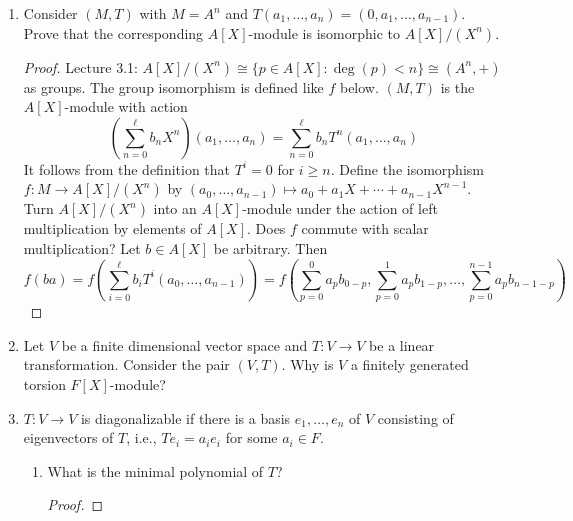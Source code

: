 \documentclass[../psets.tex]{subfiles}
\begin{document}
\begin{enumerate}
\begin{enumerate}
\begin{proof}
\begin{equation*}
                = S(S^{-1}(Xm))
                = Xm
                = T_2m
            \end{equation*}
            Now suppose that conditions (a)-(b) hold. To prove that $S$ is an $A[X]$-module isomorphism, it will suffice to show that $S$ is a group homomorphism and commutes with scalar multiplication. Just check axioms??
        \end{proof}
    \end{enumerate}
    \item Consider $(M,T)$ with $M=A^n$ and $T(a_1,\dots,a_n)=(0,a_1,\dots,a_{n-1})$. Prove that the corresponding $A[X]$-module is isomorphic to $A[X]/(X^n)$.
    \begin{proof}
        Lecture 3.1: $A[X]/(X^n)\cong\{p\in A[X]:\deg(p)<n\}\cong(A^n,+)$ as groups. The group isomorphism is defined like $f$ below.
        $(M,T)$ is the $A[X]$-module with action
        \begin{equation*}
            \left( \sum_{n=0}^\ell b_nX^n \right)(a_1,\dots,a_n) = \sum_{n=0}^\ell b_nT^n(a_1,\dots,a_n)
        \end{equation*}
        It follows from the definition that $T^i=0$ for $i\geq n$.
        Define the isomorphism $f:M\to A[X]/(X^n)$ by $(a_0,\dots,a_{n-1})\mapsto a_0+a_1X+\cdots+a_{n-1}X^{n-1}$. Turn $A[X]/(X^n)$ into an $A[X]$-module under the action of left multiplication by elements of $A[X]$. Does $f$ commute with scalar multiplication? Let $b\in A[X]$ be arbitrary. Then
        \begin{equation*}
            f(ba) = f(\sum_{i=0}^\ell b_iT^i(a_0,\dots,a_{n-1}))
            =f(\sum_{p=0}^0a_pb_{0-p},\sum_{p=0}^1a_pb_{1-p},\dots,\sum_{p=0}^{n-1}a_pb_{n-1-p})
        \end{equation*}
    \end{proof}
    \item Let $V$ be a finite dimensional vector space and $T:V\to V$ be a linear transformation. Consider the pair $(V,T)$. Why is $V$ a finitely generated torsion $F[X]$-module?
    \item $T:V\to V$ is diagonalizable if there is a basis $e_1,\dots,e_n$ of $V$ consisting of eigenvectors of $T$, i.e., $Te_i=a_ie_i$ for some $a_i\in F$.
    \begin{enumerate}
        \item What is the minimal polynomial of $T$?
        \begin{proof}


\end{proof}
\end{enumerate}
\end{enumerate}
\end{document}
